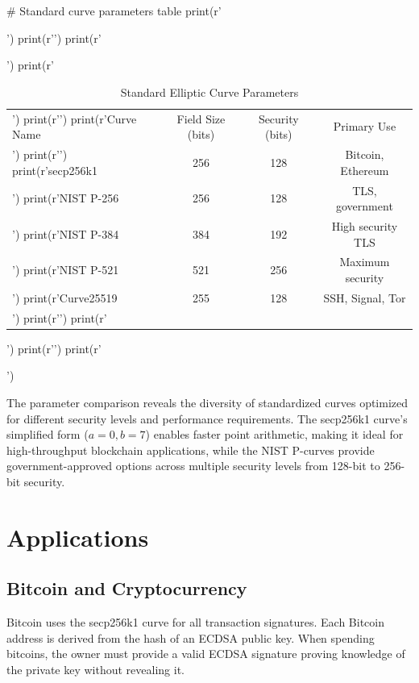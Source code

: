\documentclass[a4paper, 11pt]{article}
\begin{document}
\begin{pycode}
# Standard curve parameters table
print(r'\begin{table}[htbp]')
print(r'\centering')
print(r'\caption{Standard Elliptic Curve Parameters}')
print(r'\begin{tabular}{lccc}')
print(r'\toprule')
print(r'Curve Name & Field Size (bits) & Security (bits) & Primary Use \\')
print(r'\midrule')
print(r'secp256k1 & 256 & 128 & Bitcoin, Ethereum \\')
print(r'NIST P-256 & 256 & 128 & TLS, government \\')
print(r'NIST P-384 & 384 & 192 & High security TLS \\')
print(r'NIST P-521 & 521 & 256 & Maximum security \\')
print(r'Curve25519 & 255 & 128 & SSH, Signal, Tor \\')
print(r'\bottomrule')
print(r'\end{tabular}')
print(r'\label{tab:curves}')
print(r'\end{table}')
\end{pycode}

The parameter comparison reveals the diversity of standardized curves optimized for different security levels and performance requirements. The secp256k1 curve's simplified form ($a=0, b=7$) enables faster point arithmetic, making it ideal for high-throughput blockchain applications, while the NIST P-curves provide government-approved options across multiple security levels from 128-bit to 256-bit security.

\section{Applications}

\subsection{Bitcoin and Cryptocurrency}

Bitcoin uses the secp256k1 curve for all transaction signatures. Each Bitcoin address is derived from the hash of an ECDSA public key. When spending bitcoins, the owner must provide a valid ECDSA signature proving knowledge of the private key without revealing it.

\end{document}
